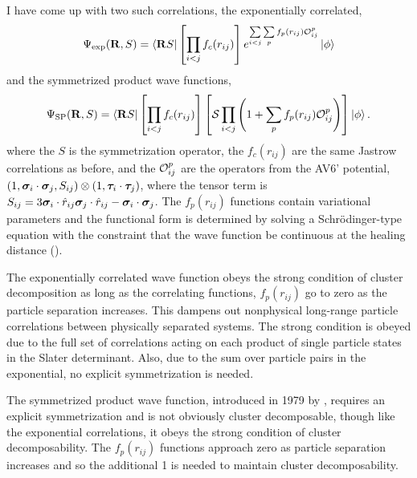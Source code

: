 I have come up with two such correlations, the exponentially correlated,
\begin{equation}
   \Psi_{\text{exp}}(\mathbf{R}, S) = \left< \mathbf{R} S \right|\left[\prod\limits_{i<j}f_c(r_{ij})\right] e^{\sum\limits_{i<j}\sum\limits_{p}f_p(r_{ij})\mathcal{O}_{ij}^p}\left| \phi \right>
   \label{equ:exppsi}
\end{equation}
and the symmetrized product wave functions,
\begin{equation}
   \Psi_{\text{SP}}(\mathbf{R}, S) = \left< \mathbf{R} S \right|\left[\prod\limits_{i<j}f_c(r_{ij})\right] \left[\mathcal{S}\prod\limits_{i<j}\left(1+\sum\limits_pf_p(r_{ij})\mathcal{O}_{ij}^p\right)\right] \left| \phi \right>.
   \label{equ:prodpsi}
\end{equation}
where the $S$ is the symmetrization operator, the $f_c(r_{ij})$ are the same Jastrow correlations as before, and the $\mathcal{O}_{ij}^p$ are the operators from the AV6' potential, $(1,\bm{\sigma}_i\cdot\bm{\sigma}_j,S_{ij})\otimes(1,\bm{\tau}_i\cdot\bm{\tau}_j)$, where the tensor term is $S_{ij} = 3\bm{\sigma}_i\cdot\hat{r}_{ij}\bm{\sigma}_j\cdot\hat{r}_{ij}-\bm{\sigma}_i\cdot\bm{\sigma}_j$. The $f_p(r_{ij})$ functions contain variational parameters and the functional form is determined by solving a Schr\"odinger-type equation with the constraint that the wave function be continuous at the healing distance (\cite{pandharipande1979,pandharipande1977}).

The exponentially correlated wave function obeys the strong condition of cluster decomposition as long as the correlating functions, $f_p(r_{ij})$ go to zero as the particle separation increases. This dampens out nonphysical long-range particle correlations between physically separated systems. The strong condition is obeyed due to the full set of correlations acting on each product of single particle states in the Slater determinant. Also, due to the sum over particle pairs in the exponential, no explicit symmetrization is needed.

The symmetrized product wave function, introduced in 1979 by \cite{pandharipande1979}, requires an explicit symmetrization and is not obviously cluster decomposable, though like the exponential correlations, it obeys the strong condition of cluster decomposability. The $f_p(r_{ij})$ functions approach zero as particle separation increases and so the additional 1 is needed to maintain cluster decomposability.

